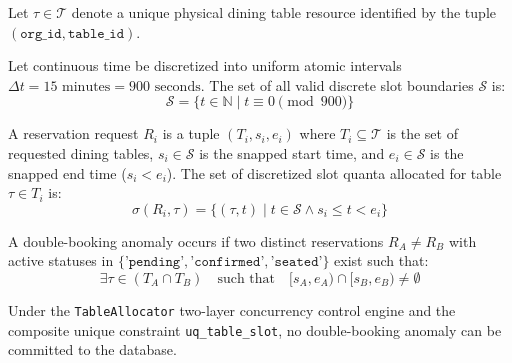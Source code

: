 \begin{definition}
Let $\tau \in \mathcal{T}$ denote a unique physical dining table resource identified by the tuple $(\texttt{org\_id}, \texttt{table\_id})$.
\end{definition}

\begin{definition}
Let continuous time be discretized into uniform atomic intervals $\Delta t = 15\text{ minutes} = 900\text{ seconds}$. The set of all valid discrete slot boundaries $\mathcal{S}$ is:
\begin{equation}
    \mathcal{S} = \{ t \in \mathbb{N} \mid t \equiv 0 \pmod{900} \}
\end{equation}
\end{definition}

\begin{definition}
A reservation request $R_i$ is a tuple $(T_i, s_i, e_i)$ where $T_i \subseteq \mathcal{T}$ is the set of requested dining tables, $s_i \in \mathcal{S}$ is the snapped start time, and $e_i \in \mathcal{S}$ is the snapped end time ($s_i < e_i$). The set of discretized slot quanta allocated for table $\tau \in T_i$ is:
\begin{equation}
    \sigma(R_i, \tau) = \{ (\tau, t) \mid t \in \mathcal{S} \land s_i \le t < e_i \}
\end{equation}
\end{definition}

\begin{definition}
A double-booking anomaly occurs if two distinct reservations $R_A \neq R_B$ with active statuses in $\{\texttt{'pending'}, \texttt{'confirmed'}, \texttt{'seated'}\}$ exist such that:
\begin{equation}
    \exists \tau \in (T_A \cap T_B) \quad \text{such that} \quad [s_A, e_A) \cap [s_B, e_B) \neq \emptyset
\end{equation}
\end{definition}

\begin{theorem}
Under the \texttt{TableAllocator} two-layer concurrency control engine and the composite unique constraint \texttt{uq\_table\_slot}, no double-booking anomaly can be committed to the database.
\end{theorem}

